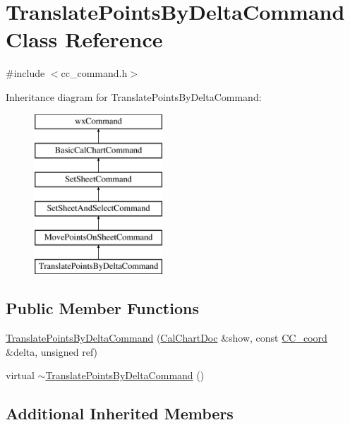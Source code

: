 \hypertarget{a00150}{\section{Translate\-Points\-By\-Delta\-Command Class Reference}
\label{a00150}
}


{\ttfamily \#include $<$cc\-\_\-command.\-h$>$}

Inheritance diagram for Translate\-Points\-By\-Delta\-Command\-:\begin{figure}[H]
\begin{center}
\leavevmode
\includegraphics[height=6.000000cm]{a00150}
\end{center}
\end{figure}
\subsection*{Public Member Functions}
\begin{DoxyCompactItemize}
\item 
\hyperlink{a00150_a525dfb455d782a3c0dac58623f11ae4e}{Translate\-Points\-By\-Delta\-Command} (\hyperlink{a00020}{Cal\-Chart\-Doc} \&show, const \hyperlink{a00029}{C\-C\-\_\-coord} \&delta, unsigned ref)
\item 
virtual \hyperlink{a00150_ab84bce485733dd8c0ff3ac4464353b01}{$\sim$\-Translate\-Points\-By\-Delta\-Command} ()
\end{DoxyCompactItemize}
\subsection*{Additional Inherited Members}


